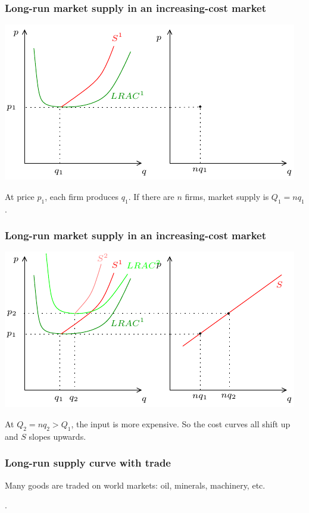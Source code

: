 \documentclass[xcolor=pdftex,dvipsnames]{beamer}
\begin{document}
\begin{frame}
\frametitle{Long-run market supply in an increasing-cost market}
\begin{center}
\includegraphics{pics/ICM1}
\end{center}
At price $p_1$, each firm produces $q_1$. If there are $n$ firms,
market supply is $Q_1=nq_1$.
\end{frame}

\begin{frame}
\frametitle{Long-run market supply in an increasing-cost market}
\begin{center}
\includegraphics{pics/ICM2}
\end{center}
At $Q_2=nq_2 > Q_1$, the input is more expensive. So the cost curves
all shift up and  $S$ slopes upwards.
\end{frame}








\begin{frame}
\frametitle{Long-run supply curve with trade}
Many goods are traded on world markets: oil, minerals, machinery, etc.

\bigskip
{}
\bigskip

\bigskip

.

\end{frame}
\end{document}
